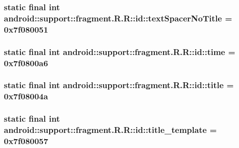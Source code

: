 \hypertarget{classandroid_1_1support_1_1fragment_1_1_r_1_1id_39c5ff436b4b3c8824d91b109724cb2b}{
\subsubsection[{textSpacerNoTitle}]{\setlength{\rightskip}{0pt plus 5cm}static final int android::support::fragment.R.R::id::textSpacerNoTitle = 0x7f080051}}
\label{classandroid_1_1support_1_1fragment_1_1_r_1_1id_39c5ff436b4b3c8824d91b109724cb2b}


\hypertarget{classandroid_1_1support_1_1fragment_1_1_r_1_1id_dd099862200628cbad9838046178c1a3}{
\subsubsection[{time}]{\setlength{\rightskip}{0pt plus 5cm}static final int android::support::fragment.R.R::id::time = 0x7f0800a6}}
\label{classandroid_1_1support_1_1fragment_1_1_r_1_1id_dd099862200628cbad9838046178c1a3}


\hypertarget{classandroid_1_1support_1_1fragment_1_1_r_1_1id_c9bf718d0da13857a57da10706a4dd79}{
\subsubsection[{title}]{\setlength{\rightskip}{0pt plus 5cm}static final int android::support::fragment.R.R::id::title = 0x7f08004a}}
\label{classandroid_1_1support_1_1fragment_1_1_r_1_1id_c9bf718d0da13857a57da10706a4dd79}


\hypertarget{classandroid_1_1support_1_1fragment_1_1_r_1_1id_ef6e933a4a9d5846660fce418d1bf4ea}{
\subsubsection[{title\_\-template}]{\setlength{\rightskip}{0pt plus 5cm}static final int android::support::fragment.R.R::id::title\_\-template = 0x7f080057}}
\label{classandroid_1_1support_1_1fragment_1_1_r_1_1id_ef6e933a4a9d5846660fce418d1bf4ea}


